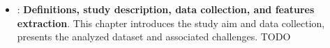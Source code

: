 \begin{itemize}
    \item \textbf{}: \textbf{Definitions, study description, data collection, and features extraction}. This chapter introduces the study aim and data collection, presents the analyzed dataset and associated challenges.  TODO





\end{itemize}
